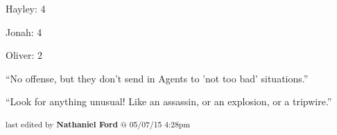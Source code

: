 
Hayley: 4

Jonah: 4

Oliver: 2



``No offense, but they don't send in Agents to 'not too bad' situations.''




``Look for anything unusual!  Like an assassin, or an explosion, or a tripwire.'' 



\vspace{\fill}

\begin{flushright}
\textsubscript{last edited by \textbf{Nathaniel Ford} @ 05/07/15 4:28pm}
\end{flushright}

